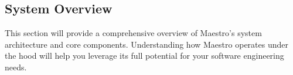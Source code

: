 \subsection*{System Overview}

This section will provide a comprehensive overview of Maestro's system architecture and core components. Understanding how Maestro operates under the hood will help you leverage its full potential for your software engineering needs.